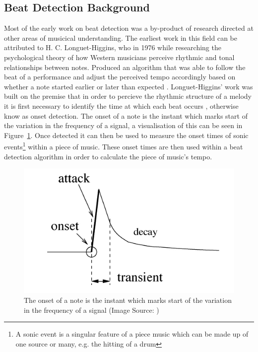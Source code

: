 \documentclass[a4paper, 11pt]{article}
\begin{document}
\subsection{Beat Detection Background}
Most of the early work on beat detection was a by-product of research directed at other areas of musicical understanding. The earliest work in this field can be attributed to H. C. Longuet-Higgins, who in 1976 while researching the psychological theory of how Western musicians perceive rhythmic and tonal relationships between notes. Produced an algorithm that was able to follow the beat of a performance and adjust the perceived tempo accordingly based on whether a note started earlier or later than expected \cite{allen-danneburg}. Longuet-Higgins' work was built on the premise that in order to percieve the rhythmic structure of a melody it is first necessary to identify the time at which each beat occurs \cite{longeut1}, otherwise know as onset detection. The onset of a note is the instant which marks start of the variation in the frequency of a signal, a visualisation of this can be seen in Figure~\ref{fig: Onset}. Once detected it can then be used to measure the onset times of sonic events\footnote{A sonic event is a singular feature of a piece music which can be made up of one source or many\cite{sonic}, e.g. the hitting of a drum} within a piece of music\cite{mirex-onset}. These onset times are then used within a beat detection algorithm in order to calculate the piece of music's tempo. 

\begin{figure}[ht]
	\centering
	\includegraphics[scale=0.40]{Onset}
	\caption{The onset of a note is the instant which marks start of the variation in the frequency of a signal (Image Source: \cite{onset-tut})}
	\label{fig: Onset}
\end{figure}
\end{document}
